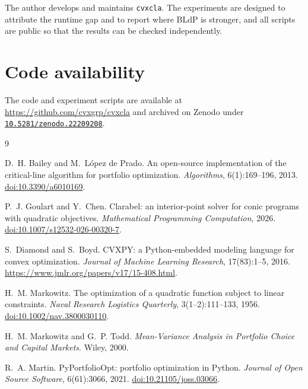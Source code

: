 \documentclass[11pt,a4paper]{article}
\newcommand{\code}[1]{\texttt{#1}}
\newcommand{\cvxcla}{\code{cvxcla}}
\begin{document}
The author develops and maintains \cvxcla{}. The experiments are designed to
attribute the runtime gap and to report where BLdP is stronger, and all
scripts are public so that the results can be checked independently.

\section*{Code availability}

The code and experiment scripts are available at
\url{https://github.com/cvxgrp/cvxcla} and archived on Zenodo under
\href{https://doi.org/10.5281/zenodo.22209208}{\code{10.5281/zenodo.22209208}}.

\begingroup
\small
\begin{thebibliography}{9}

D.~H. Bailey and M.~López de Prado.
\newblock An open-source implementation of the critical-line algorithm for
  portfolio optimization.
\newblock \emph{Algorithms}, 6(1):169--196, 2013.
\newblock \href{https://doi.org/10.3390/a6010169}{doi:10.3390/a6010169}.

P.~J. Goulart and Y.~Chen.
\newblock Clarabel: an interior-point solver for conic programs with
  quadratic objectives.
\newblock \emph{Mathematical Programming Computation}, 2026.
\newblock \href{https://doi.org/10.1007/s12532-026-00320-7}{doi:10.1007/s12532-026-00320-7}.

S.~Diamond and S.~Boyd.
\newblock CVXPY: a Python-embedded modeling language for convex optimization.
\newblock \emph{Journal of Machine Learning Research}, 17(83):1--5, 2016.
\newblock \url{https://www.jmlr.org/papers/v17/15-408.html}.

H.~M. Markowitz.
\newblock The optimization of a quadratic function subject to linear
  constraints.
\newblock \emph{Naval Research Logistics Quarterly}, 3(1--2):111--133, 1956.
\newblock \href{https://doi.org/10.1002/nav.3800030110}{doi:10.1002/nav.3800030110}.

H.~M. Markowitz and G.~P. Todd.
\newblock \emph{Mean-Variance Analysis in Portfolio Choice and Capital
  Markets}.
\newblock Wiley, 2000.

R.~A. Martin.
\newblock PyPortfolioOpt: portfolio optimization in Python.
\newblock \emph{Journal of Open Source Software}, 6(61):3066, 2021.
\newblock \href{https://doi.org/10.21105/joss.03066}{doi:10.21105/joss.03066}.


\end{thebibliography}
\end{document}
